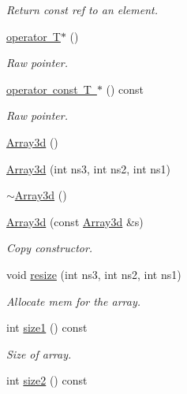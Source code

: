\begin{DoxyCompactItemize}
\begin{DoxyCompactList}\small\item\em Return const ref to an element. \end{DoxyCompactList}\item 
\mbox{\hyperlink{classXMLArray_1_1Array3d_aec4e2efc011195e91a742b7fa33bbbdb}{operator T$\ast$}} ()
\begin{DoxyCompactList}\small\item\em Raw pointer. \end{DoxyCompactList}\item 
\mbox{\hyperlink{classXMLArray_1_1Array3d_a8eb9d716a0efb8d1ac737fcbef8dd50c}{operator const T $\ast$}} () const
\begin{DoxyCompactList}\small\item\em Raw pointer. \end{DoxyCompactList}\item 
\mbox{\hyperlink{classXMLArray_1_1Array3d_a05f33dbf6ca20ca7a16ec3e6d74f272b}{Array3d}} ()
\item 
\mbox{\hyperlink{classXMLArray_1_1Array3d_ae97f5fabfb023196e45ab6fd53d533d9}{Array3d}} (int ns3, int ns2, int ns1)
\item 
\mbox{\hyperlink{classXMLArray_1_1Array3d_a8ad71a50d673f74c88d605214a4acbd7}{$\sim$\+Array3d}} ()
\item 
\mbox{\hyperlink{classXMLArray_1_1Array3d_ab537a98b1435f3201b099ace57ab15bd}{Array3d}} (const \mbox{\hyperlink{classXMLArray_1_1Array3d}{Array3d}} \&s)
\begin{DoxyCompactList}\small\item\em Copy constructor. \end{DoxyCompactList}\item 
void \mbox{\hyperlink{classXMLArray_1_1Array3d_afe27b06ef40efdd87dbea00eafa35287}{resize}} (int ns3, int ns2, int ns1)
\begin{DoxyCompactList}\small\item\em Allocate mem for the array. \end{DoxyCompactList}\item 
int \mbox{\hyperlink{classXMLArray_1_1Array3d_aa084cbb2756e62556c9ec4c4cb971bf0}{size1}} () const
\begin{DoxyCompactList}\small\item\em Size of array. \end{DoxyCompactList}\item 
int \mbox{\hyperlink{classXMLArray_1_1Array3d_a1ea00a28e916b3fd9102ce7057c02dac}{size2}} () const
\item 

\end{DoxyCompactItemize}
